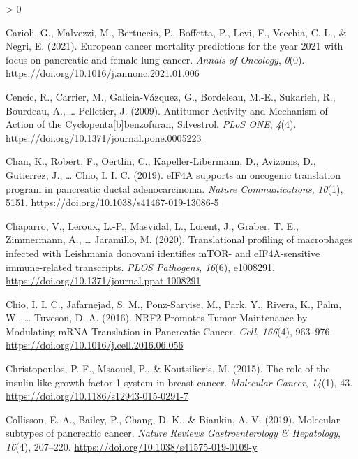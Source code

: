 \documentclass[
  12pt,
  openany]{book}
\newlength{\cslhangindent}
\newenvironment{CSLReferences}[2] %
 {%
  \setlength{\parindent}{0pt}
  \ifodd #1 \everypar{\setlength{\hangindent}{\cslhangindent}}\ignorespaces\fi
  \ifnum #2 > 0
  \setlength{\parskip}{#2\baselineskip}
  \fi
 }%
 {}
\begin{document}
\begin{CSLReferences}{1}{0}
\leavevmode\hypertarget{ref-Carioli2021}{}%
Carioli, G., Malvezzi, M., Bertuccio, P., Boffetta, P., Levi, F., Vecchia, C. L., \& Negri, E. (2021). European cancer mortality predictions for the year 2021 with focus on pancreatic and female lung cancer. \emph{Annals of Oncology}, \emph{0}(0). \url{https://doi.org/10.1016/j.annonc.2021.01.006}

\leavevmode\hypertarget{ref-Cencic2009}{}%
Cencic, R., Carrier, M., Galicia-Vázquez, G., Bordeleau, M.-E., Sukarieh, R., Bourdeau, A., \ldots{} Pelletier, J. (2009). Antitumor {Activity} and {Mechanism} of {Action} of the {Cyclopenta}{[}b{]}benzofuran, {Silvestrol}. \emph{PLoS ONE}, \emph{4}(4). \url{https://doi.org/10.1371/journal.pone.0005223}

\leavevmode\hypertarget{ref-Chan2019}{}%
Chan, K., Robert, F., Oertlin, C., Kapeller-Libermann, D., Avizonis, D., Gutierrez, J., \ldots{} Chio, I. I. C. (2019). {eIF4A} supports an oncogenic translation program in pancreatic ductal adenocarcinoma. \emph{Nature Communications}, \emph{10}(1), 5151. \url{https://doi.org/10.1038/s41467-019-13086-5}

\leavevmode\hypertarget{ref-Chaparro2020}{}%
Chaparro, V., Leroux, L.-P., Masvidal, L., Lorent, J., Graber, T. E., Zimmermann, A., \ldots{} Jaramillo, M. (2020). Translational profiling of macrophages infected with {Leishmania} donovani identifies {mTOR}- and {eIF4A}-sensitive immune-related transcripts. \emph{PLOS Pathogens}, \emph{16}(6), e1008291. \url{https://doi.org/10.1371/journal.ppat.1008291}

\leavevmode\hypertarget{ref-Chio2016}{}%
Chio, I. I. C., Jafarnejad, S. M., Ponz-Sarvise, M., Park, Y., Rivera, K., Palm, W., \ldots{} Tuveson, D. A. (2016). {NRF2 Promotes Tumor Maintenance} by {Modulating mRNA Translation} in {Pancreatic Cancer}. \emph{Cell}, \emph{166}(4), 963--976. \url{https://doi.org/10.1016/j.cell.2016.06.056}

\leavevmode\hypertarget{ref-Christopoulos2015}{}%
Christopoulos, P. F., Msaouel, P., \& Koutsilieris, M. (2015). The role of the insulin-like growth factor-1 system in breast cancer. \emph{Molecular Cancer}, \emph{14}(1), 43. \url{https://doi.org/10.1186/s12943-015-0291-7}

\leavevmode\hypertarget{ref-Collisson2019}{}%
Collisson, E. A., Bailey, P., Chang, D. K., \& Biankin, A. V. (2019). Molecular subtypes of pancreatic cancer. \emph{Nature Reviews Gastroenterology \& Hepatology}, \emph{16}(4), 207--220. \url{https://doi.org/10.1038/s41575-019-0109-y}


\end{CSLReferences}
\end{document}
